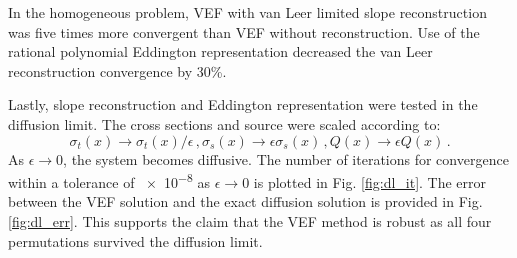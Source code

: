 In the homogeneous problem, VEF with van Leer limited slope reconstruction was five times more convergent than VEF without reconstruction. Use of the rational polynomial Eddington representation decreased the van Leer reconstruction convergence by 30\%. 

Lastly, slope reconstruction and Eddington representation were tested in the diffusion limit. The cross sections and source were scaled according to: 
	\begin{subequations} \label{res:scaling}
		\begin{equation} 
			\sigma_t(x) \rightarrow \sigma_t(x)/\epsilon \,, 
		\end{equation}
		\begin{equation}
			\sigma_s(x) \rightarrow \epsilon \sigma_s(x) \,,
		\end{equation}
		\begin{equation}
			Q(x) \rightarrow \epsilon Q(x) \,. 
		\end{equation}
	\end{subequations}
As $\epsilon \rightarrow 0$, the system becomes diffusive. The number of iterations for convergence within a tolerance of \num{e-8} as $\epsilon \rightarrow 0$ is plotted in Fig. \ref{fig:dl_it}. The error between the VEF solution and the exact diffusion solution is provided in Fig. \ref{fig:dl_err}. This supports the claim that the VEF method is robust as all four permutations survived the diffusion limit. 
	
